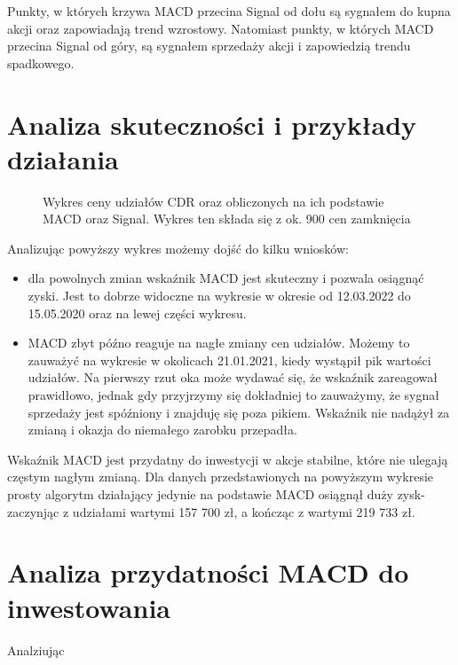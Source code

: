 \documentclass{article}
\begin{document}
    Punkty, w których krzywa MACD przecina Signal od dołu są sygnałem do kupna akcji oraz zapowiadają trend wzrostowy.
    Natomiast punkty, w których MACD przecina Signal od góry, są sygnałem sprzedaży akcji i zapowiedzią trendu spadkowego. 

\section{Analiza skuteczności i przykłady działania}
    \begin{figure}[H]
        \noindent{}
        \caption{Wykres ceny udziałów CDR oraz obliczonych na ich podstawie MACD oraz Signal. Wykres ten składa się z ok. 900 cen zamknięcia}
    \end{figure}

    Analizując powyższy wykres możemy dojść do kilku wniosków:
    \begin{itemize}
        \item dla powolnych zmian wskaźnik MACD jest skuteczny i pozwala osiągnąć zyski. Jest to dobrze widoczne na wykresie w okresie od 12.03.2022 do 15.05.2020 oraz na lewej części wykresu.
        \item MACD zbyt późno reaguje na nagłe zmiany cen udziałów. Możemy to zauważyć na wykresie w okolicach 21.01.2021, kiedy wystąpił pik wartości udziałów.
         Na pierwszy rzut oka może wydawać się, że wskaźnik zareagował prawidłowo, jednak gdy przyjrzymy się dokładniej to zauważymy, że sygnał sprzedaży jest spóźniony i znajduję się poza pikiem.
         Wskaźnik nie nadążył za zmianą i okazja do niemałego zarobku przepadła.
    \end{itemize}

    Wskaźnik MACD jest przydatny do inwestycji w akcje stabilne, które nie ulegają częstym nagłym zmianą.
    Dla danych przedstawionych na powyższym wykresie prosty algorytm działający jedynie na podstawie MACD
    osiągnął duży zysk- zaczynjąc z udziałami wartymi 157 700 zł, a kończąc z wartymi 219 733 zł.
   

    


\section{Analiza przydatności MACD do inwestowania}

    Analziując
\end{document}

